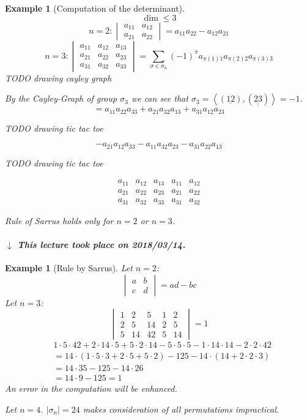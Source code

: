\documentclass{article}
\newcounter{lecref}[section]
\numberwithin{lecref}{section}
\newtheorem{example}[lecref]{Example}
\newcommand{\angel}[1]{\left\langle#1\right\rangle}
\newcommand{\card}[1]{\left|#1\right|}
\newcommand{\dateref}[1]{%
  \begin{mdframed}[backgroundcolor=gray!10,innerbottommargin=0pt,innertopmargin=0pt]
    \paragraph{\textit{$\downarrow$ This lecture took place on #1.}}%
  \end{mdframed}%
}
\begin{document}
\begin{example}[Computation of the determinant] %
  \[ \dim \leq 3 \]
  \[
    n = 2:
    \begin{vmatrix} a_{11} & a_{12} \\ a_{21} & a_{22} \end{vmatrix} = a_{11} a_{22} - a_{12} a_{21}
  \] \[
    n = 3:
    \begin{vmatrix} a_{11} & a_{12} & a_{13} \\ a_{21} & a_{22} & a_23 \\ a_{31} & a_{32} & a_{33} \end{vmatrix}
    = \sum_{\sigma \in \sigma_n} (-1)^\pi a_{\pi(1)1} a_{\pi(2)2} a_{\pi(3)3}
  \]
  TODO drawing cayley graph

  By the Cayley-Graph of group $\sigma_3$ we can see that $\sigma_3 = \angel{(\underline{12}), (\underline{\underline{23}})} = -1$.
  \[ = a_{11} a_{22} a_{33} + a_{21} a_{32} a_{13} + a_{31} a_{12} a_{23} \]

  TODO drawing tic tac toe

  \[ -a_{21} a_{12} a_{33} - a_{11} a_{32} a_{23} - a_{31} a_{22} a_{13} \]

  TODO drawing tic tac toe

  \[
    \begin{array}{ccc|cc}
      a_{11} & a_{12} & a_{13} & a_{11} & a_{12} \\
      a_{21} & a_{22} & a_{23} & a_{21} & a_{22} \\
      a_{31} & a_{32} & a_{33} & a_{31} & a_{32}
    \end{array}
  \]

  \emph{Rule of Sarrus} holds only for $n=2$ or $n=3$.
\end{example}

\dateref{2018/03/14}

\begin{example}[Rule by Sarrus]
  Let $n=2$:
  \[
    \begin{vmatrix} a & b \\ c & d \end{vmatrix} = ad - bc
  \]
  Let $n = 3$:
  \[
    \begin{vmatrix}
      1 & 2 & 5 & 1 & 2 \\
      2 & 5 & 14 & 2 & 5 \\
      5 & 14 & 42 & 5 & 14
    \end{vmatrix}
    = 1
  \]
  \begin{align*}
    &1 \cdot 5 \cdot 42 + 2 \cdot 14 \cdot 5 + 5 \cdot 2 \cdot 14 - 5 \cdot 5 \cdot 5 - 1 \cdot 14 \cdot 14 - 2 \cdot 2 \cdot 42 \\
      &= 14 \cdot (1 \cdot 5 \cdot 3 + 2 \cdot 5 + 5 \cdot 2) - 125 - 14 \cdot (14 + 2 \cdot 2 \cdot 3) \\
      &= 14 \cdot 35 - 125 - 14 \cdot 26 \\
      &= 14 \cdot 9 - 125 = 1
  \end{align*}
  An error in the computation will be enhanced.

  Let $n = 4$.
  $\card{\sigma_n} = 24$ makes consideration of all permutations impractical.
\end{example}
\end{document}

